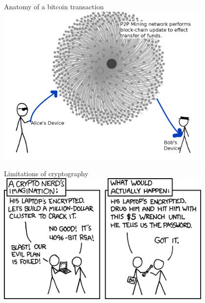 \documentclass{beamer}
\begin{document}
\begin{frame}
 Anatomy of a bitcoin transaction\\
 \vspace{1em}
 \includegraphics[width=0.8\textwidth]{AnatomyOfBitcoin}
\end{frame}

\begin{frame}
 Limitations of cryptography\\
 \vspace{1em}
 \includegraphics[width=0.8\textwidth]{security}
\end{frame}
\end{document}
